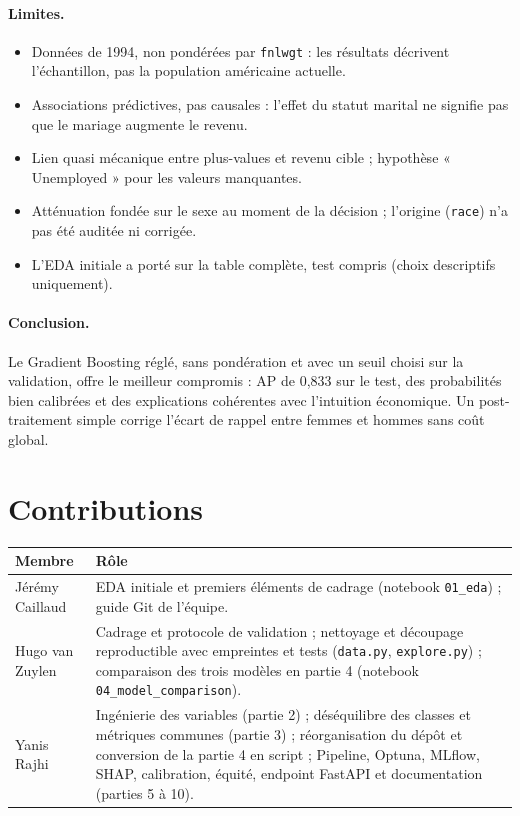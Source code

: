 \documentclass[11pt,a4paper]{article}
\begin{document}
\paragraph{Limites.}
\begin{itemize}
\item Données de 1994, non pondérées par \texttt{fnlwgt} : les résultats décrivent l'échantillon, pas la population américaine actuelle.
\item Associations prédictives, pas causales : l'effet du statut marital ne signifie pas que le mariage augmente le revenu.
\item Lien quasi mécanique entre plus-values et revenu cible ; hypothèse « Unemployed » pour les valeurs manquantes.
\item Atténuation fondée sur le sexe au moment de la décision ; l'origine (\texttt{race}) n'a pas été auditée ni corrigée.
\item L'EDA initiale a porté sur la table complète, test compris (choix descriptifs uniquement).
\end{itemize}

\paragraph{Conclusion.} Le Gradient Boosting réglé, sans pondération et avec un seuil choisi sur la validation, offre le meilleur compromis : AP de 0,833 sur le test, des probabilités bien calibrées et des explications cohérentes avec l'intuition économique. Un post-traitement simple corrige l'écart de rappel entre femmes et hommes sans coût global.

\section*{Contributions}
\begin{tabularx}{\textwidth}{lX}
\toprule
Membre & Rôle \\
\midrule
Jérémy Caillaud & EDA initiale et premiers éléments de cadrage (notebook \texttt{01\_eda}) ; guide Git de l'équipe. \\
Hugo van Zuylen & Cadrage et protocole de validation ; nettoyage et découpage reproductible avec empreintes et tests (\texttt{data.py}, \texttt{explore.py}) ; comparaison des trois modèles en partie 4 (notebook \texttt{04\_model\_comparison}). \\
Yanis Rajhi & Ingénierie des variables (partie 2) ; déséquilibre des classes et métriques communes (partie 3) ; réorganisation du dépôt et conversion de la partie 4 en script ; Pipeline, Optuna, MLflow, SHAP, calibration, équité, endpoint FastAPI et documentation (parties 5 à 10). \\
\bottomrule
\end{tabularx}
\end{document}
